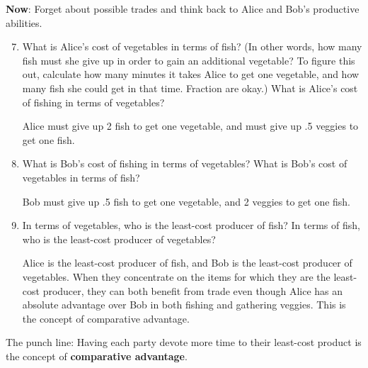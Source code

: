\documentclass{article}
\newcommand{\myskip}{\vspace{.1in}}
\begin{document}
\noindent \textbf{Now}: Forget about possible trades and think back to Alice and Bob's productive abilities. 

    \begin{enumerate}
    \setcounter{enumi}{6}
    \item What is Alice's cost of vegetables in terms of fish? (In other words, how many fish must she give up in order to gain an additional vegetable? To figure this out, calculate how many minutes it takes Alice to get one vegetable, and how many fish she could get in that time. Fraction are okay.) What is Alice's cost of fishing in terms of vegetables?  
\myskip

\begin{KEY}
Alice must give up 2 fish to get one vegetable, and must give up .5 veggies to get one fish. 
\end{KEY}

    \item What is Bob's cost of fishing in terms of vegetables? What is Bob's cost of vegetables in terms of fish? 
\myskip

\begin{KEY}
Bob must give up .5 fish to get one vegetable, and 2 veggies to get one fish. 
\end{KEY}

    \item In terms of vegetables, who is the least-cost producer of fish? In terms of fish, who is the least-cost producer of vegetables?%
\myskip

\begin{KEY}
Alice is the least-cost producer of fish, and Bob is the least-cost producer of vegetables. When they concentrate on the items for which they are the least-cost producer, they can both benefit from trade even though Alice has an absolute advantage over Bob in both fishing and gathering veggies. This is the concept of comparative advantage.
\end{KEY}

    \end{enumerate}

The punch line: Having each party devote more time to their least-cost product is the concept of \textbf{comparative advantage}. 
\end{document}
